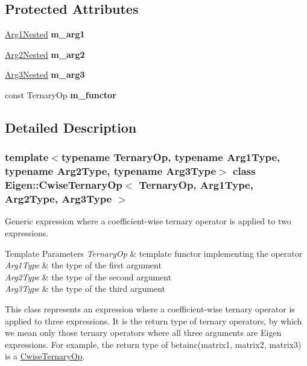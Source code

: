 \subsection*{Protected Attributes}
\begin{DoxyCompactItemize}
\item 
\mbox{\label{class_eigen_1_1_cwise_ternary_op_a4893685eed4b6cc89cc5bf49de5abd27}} 
\mbox{\hyperlink{struct_eigen_1_1internal_1_1true__type}{Arg1\+Nested}} {\bfseries m\+\_\+arg1}
\item 
\mbox{\label{class_eigen_1_1_cwise_ternary_op_a722d63231b2bac72fe3158ff0deac588}} 
\mbox{\hyperlink{struct_eigen_1_1internal_1_1true__type}{Arg2\+Nested}} {\bfseries m\+\_\+arg2}
\item 
\mbox{\label{class_eigen_1_1_cwise_ternary_op_a99b7ccb1290bb0bbd2ff72e92b7a7bee}} 
\mbox{\hyperlink{struct_eigen_1_1internal_1_1true__type}{Arg3\+Nested}} {\bfseries m\+\_\+arg3}
\item 
\mbox{\label{class_eigen_1_1_cwise_ternary_op_ac58df3092f0c8329fd3fb8dfad6c2631}} 
const Ternary\+Op {\bfseries m\+\_\+functor}
\end{DoxyCompactItemize}


\subsection{Detailed Description}
\subsubsection*{template$<$typename Ternary\+Op, typename Arg1\+Type, typename Arg2\+Type, typename Arg3\+Type$>$\newline
class Eigen\+::\+Cwise\+Ternary\+Op$<$ Ternary\+Op, Arg1\+Type, Arg2\+Type, Arg3\+Type $>$}

Generic expression where a coefficient-\/wise ternary operator is applied to two expressions. 


\begin{DoxyTemplParams}{Template Parameters}
{\em Ternary\+Op} & template functor implementing the operator \\
\hline
{\em Arg1\+Type} & the type of the first argument \\
\hline
{\em Arg2\+Type} & the type of the second argument \\
\hline
{\em Arg3\+Type} & the type of the third argument\\
\hline
\end{DoxyTemplParams}
This class represents an expression where a coefficient-\/wise ternary operator is applied to three expressions. It is the return type of ternary operators, by which we mean only those ternary operators where all three arguments are Eigen expressions. For example, the return type of betainc(matrix1, matrix2, matrix3) is a \mbox{\hyperlink{class_eigen_1_1_cwise_ternary_op}{Cwise\+Ternary\+Op}}.

